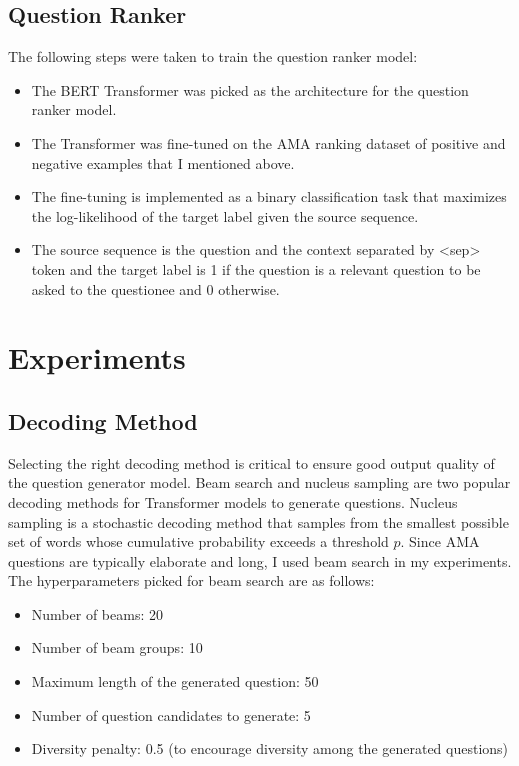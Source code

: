 \documentclass[paper=a4, fontsize=11pt]{scrartcl}
\numberwithin{equation}{section}		%
\numberwithin{figure}{section}			%
\numberwithin{table}{section}				%
\begin{document}
\subsection{Question Ranker}
The following steps were taken to train the question ranker model:
\begin{itemize}
  \item The BERT Transformer was picked as the architecture for the question ranker model.
  \item The Transformer was fine-tuned on the AMA ranking dataset of positive and negative examples that I mentioned above.
  \item The fine-tuning is implemented as a binary classification task that maximizes the log-likelihood of the target label given the source sequence.
  \item The source sequence is the question and the context separated by <sep> token and the target label is 1 if the question is a relevant question to be asked to the questionee and 0 otherwise.
\end{itemize}

\section{Experiments}
\subsection*{Decoding Method}
Selecting the right decoding method is critical to ensure good output quality of the question generator model.
Beam search and nucleus sampling are two popular decoding methods for Transformer models to generate questions.
Nucleus sampling is a stochastic decoding method that samples from the smallest possible set of words whose cumulative probability exceeds a threshold $p$.
Since AMA questions are typically elaborate and long, I used beam search in my experiments.
The hyperparameters picked for beam search are as follows:

\begin{itemize}
  \setlength\itemsep{0.1em}
  \small
  \item Number of beams: 20
  \item Number of beam groups: 10
  \item Maximum length of the generated question: 50
  \item Number of question candidates to generate: 5
  \item Diversity penalty: 0.5 (to encourage diversity among the generated questions)
\end{itemize}
\end{document}
